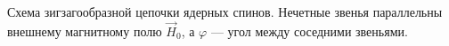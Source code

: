 Схема зигзагообразной цепочки ядерных спинов.
Нечетные звенья параллельны внешнему магнитному полю $\vec{H}_0$,
а $\varphi$ --- угол между соседними звеньями.
